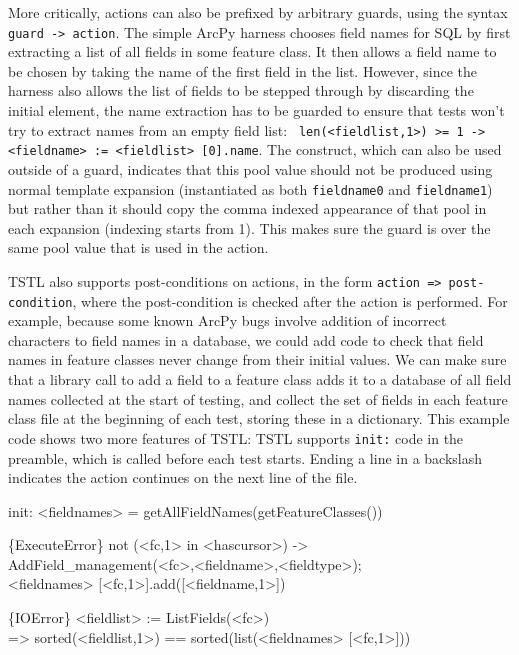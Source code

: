 More critically, actions can also be prefixed by arbitrary guards, using
the syntax {\tt guard -> action}.  The simple ArcPy harness chooses
field names for SQL by first extracting a list of all fields in some
feature class.  It then allows a field name to be chosen by taking the
name of the first field in the list.  However, since the harness also
allows the list of fields to be stepped through by discarding the
initial element, the name extraction has to be guarded to ensure that
tests won't try to extract names from an empty field list:  {\tt
  len(<fieldlist,1>) >= 1 -> <fieldname> := <fieldlist> [0].name}.
The {\tt <fieldlist,1>} construct, which can also be used outside of a
guard, indicates that this pool value should not be produced using
normal template expansion (instantiated as both {\tt fieldname0} and
{\tt fieldname1}) but rather than it should copy the comma indexed
appearance of that pool in each expansion (indexing starts from 1).  This makes sure the guard
is over the same pool value that is used in the action.

TSTL also supports post-conditions on actions, in the form {\tt action
  => post-condition}, where the post-condition is checked after the
action is performed.  For example, because some known ArcPy bugs
involve addition of incorrect characters to field names in a database,
we could add code to check that field names in feature classes never
change from their initial values.  We can make sure that a library
call to add a field to a feature class adds it to a database of all
field names collected at the start of testing, and collect the set of
fields in each feature class file at the beginning of each test,
storing these in a dictionary.  This example code shows two more
features of TSTL: TSTL supports {\tt init:} code in the preamble,
which is called before each test starts.  Ending a line in a backslash
indicates the action continues on the next line of the file.

{\scriptsize
\begin{code}
init: <fieldnames> = getAllFieldNames(getFeatureClasses())

\{ExecuteError\} not (<fc,1> in <hascursor>) -> \\
   AddField\_management(<fc>,<fieldname>,<fieldtype>); \\
   <fieldnames> [<fc,1>].add([<fieldname,1>])

\{IOError\} <fieldlist> := ListFields(<fc>) \\
  => sorted(<fieldlist,1>) == sorted(list(<fieldnames> [<fc,1>]))
\end{code}
}

